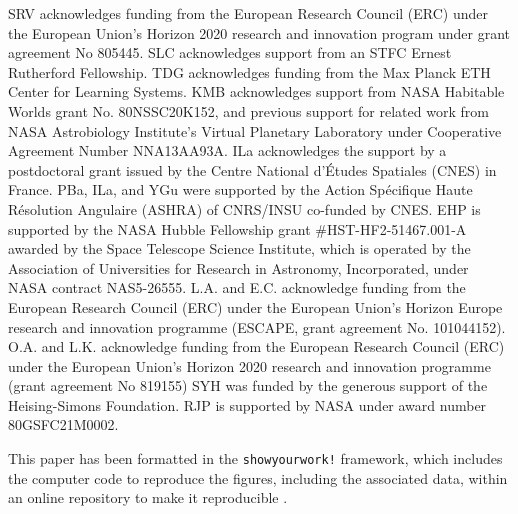 \documentclass[
    usenatbib,
]{mnras}
\begin{document}
SRV acknowledges funding from the European Research Council (ERC) under the European Union’s Horizon 2020 research and innovation program under grant agreement No 805445.
SLC acknowledges support from an STFC Ernest Rutherford Fellowship. 
TDG acknowledges funding from the Max Planck ETH Center for Learning Systems.
KMB acknowledges support from NASA Habitable Worlds grant No. 80NSSC20K152, and previous support for related work from NASA Astrobiology Institute's Virtual Planetary Laboratory under Cooperative Agreement Number NNA13AA93A.
ILa acknowledges the support by a postdoctoral grant issued by the Centre National d'Études Spatiales (CNES) in France.
PBa, ILa, and YGu were supported by the Action Spécifique Haute Résolution Angulaire (ASHRA) of CNRS/INSU co-funded by CNES.
EHP is supported by the NASA Hubble Fellowship grant \#HST-HF2-51467.001-A awarded by the Space Telescope Science Institute, which is operated by the Association of Universities for Research in Astronomy, Incorporated, under NASA contract NAS5-26555.
L.A. and E.C. acknowledge funding from the European Research Council (ERC) under the European Union's Horizon Europe research and innovation programme (ESCAPE, grant agreement No. 101044152).
O.A. and L.K. acknowledge funding from the European Research Council (ERC) under the European Union’s Horizon 2020 research and innovation programme (grant agreement No 819155)
SYH was funded by the generous support of the Heising-Simons Foundation.
RJP is supported by NASA under award number 80GSFC21M0002.

This paper has been formatted in the {\tt showyourwork!} framework, which includes the computer code to reproduce the figures, including the associated data, within an online repository to make it reproducible \citep{Luger2021}.






\end{document}

